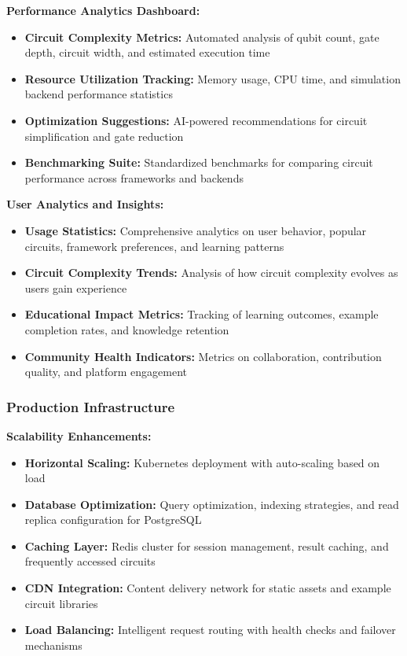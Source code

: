 \textbf{Performance Analytics Dashboard:}
\begin{itemize}
    \item \textbf{Circuit Complexity Metrics:} Automated analysis of qubit count, gate depth, circuit width, and estimated execution time
    \item \textbf{Resource Utilization Tracking:} Memory usage, CPU time, and simulation backend performance statistics
    \item \textbf{Optimization Suggestions:} AI-powered recommendations for circuit simplification and gate reduction
    \item \textbf{Benchmarking Suite:} Standardized benchmarks for comparing circuit performance across frameworks and backends
\end{itemize}

\textbf{User Analytics and Insights:}
\begin{itemize}
    \item \textbf{Usage Statistics:} Comprehensive analytics on user behavior, popular circuits, framework preferences, and learning patterns
    \item \textbf{Circuit Complexity Trends:} Analysis of how circuit complexity evolves as users gain experience
    \item \textbf{Educational Impact Metrics:} Tracking of learning outcomes, example completion rates, and knowledge retention
    \item \textbf{Community Health Indicators:} Metrics on collaboration, contribution quality, and platform engagement
\end{itemize}

\subsubsection{Production Infrastructure}

\textbf{Scalability Enhancements:}
\begin{itemize}
    \item \textbf{Horizontal Scaling:} Kubernetes deployment with auto-scaling based on load
    \item \textbf{Database Optimization:} Query optimization, indexing strategies, and read replica configuration for PostgreSQL
    \item \textbf{Caching Layer:} Redis cluster for session management, result caching, and frequently accessed circuits
    \item \textbf{CDN Integration:} Content delivery network for static assets and example circuit libraries
    \item \textbf{Load Balancing:} Intelligent request routing with health checks and failover mechanisms
\end{itemize}

